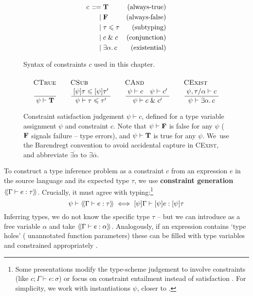 \begin{figure}
    \centering
    \begin{align*}
        {c} \,::=&\; 
        \mathbf T
        & \text{(always-true)}
        \\ \mid&\;
        \mathbf F
        & \text{(always-false)}
        \\ \mid&\;
        \tau \leqslant \tau 
        & \text{(subtyping)}
        \\ \mid&\;
        c \;\&\; c
         & \text{(conjunction)}
        \\ \mid&\; 
        \exists \alpha \ldotp c
        & \text{(existential)}
    \end{align*}
    \caption{Syntax of constraints $c$ used in this chapter.}
    \label{fig:constraints}
\end{figure}

\begin{figure}
    \centering
    $$
    \irule{CTrue}{}{\psi \vdash \tru}
    \quad
    \irule{CSub}{\substx \psi \tau \sub \substx \psi \tau'}{\psi \vdash \tau \sub \tau'}
    \quad
    \irule{CAnd}{\psi \vdash c \quad \psi \vdash c'}{\psi \vdash c \und c'}
    \quad 
    \irule{CExist}{\psi, \tau/\alpha \vdash c}{\psi \vdash \exists \alpha \ldotp c}
    $$
    \caption{Constraint satisfaction judgement $\psi \vdash c$, defined for a type variable assignment $\psi$ and constraint $c$. Note that $\psi \vdash \mathbf F$ is false for any $\psi$ ($\mathbf F$ signals failure -- type errors), and $\psi \vdash \mathbf T$ is true for any $\psi$. We~use the Barendregt convention to avoid accidental capture in \textsc{CExist}, and abbreviate $\overline {\exists \alpha}$ to $\exists \overline{\alpha}$.}
    \label{fig:satisfaction}
\end{figure}
 
To construct a type inference problem as a constraint $c$ from an expression $e$ in the source language and its expected type $\tau$, we use \textbf{constraint generation} $\cstr{\Gamma}{e}{\tau}$. Crucially, it must agree with typing:\footnote{Some presentations modify the type-scheme judgement to involve constraints (like $c; \Gamma \vdash e : \sigma$) \cite{essence-of-ml-type-inference} or focus on constraint entailment instead of satisfaction \cite{constraint-based-hm}. For simplicity, we work with instantiations $\psi$, closer to \eg{} \cite[Section 3.4]{constraint-based-freeze-ml}.}
$$ \psi \vdash \cstr{\Gamma}{e}{\tau} \iff \substx{\psi}\Gamma \vdash \substx{\psi}{e} : \substx \psi \tau $$
Inferring types, we do not know the specific type $\tau$ -- but we can introduce as a free variable $\alpha$ and take $\cstr{\Gamma}{e}{\alpha}$. Analogously, if an expression contains `type holes' (\eg{} unannotated function parameters) these can be filled with type variables and constrained appropriately \cite{tapl}.


